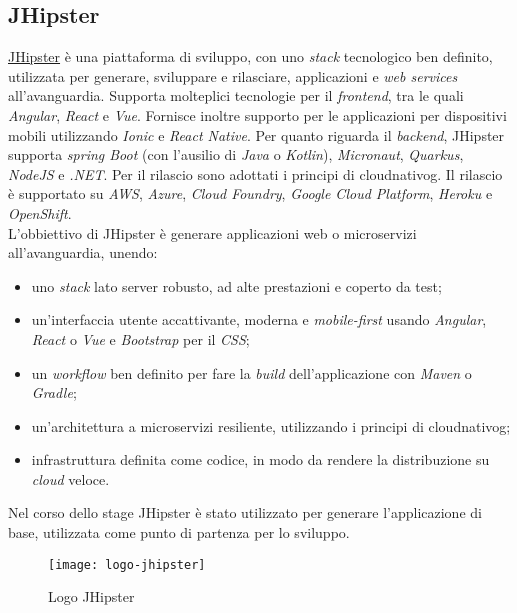 \subsection{JHipster}
\label{jhi}
\href{https://www.jhipster.tech/}{JHipster} è una piattaforma di sviluppo, con uno \textit{stack} tecnologico ben definito, utilizzata per generare, sviluppare e rilasciare, applicazioni e \textit{web services} all'avanguardia. Supporta molteplici tecnologie per il \textit{frontend}, tra le quali \textit{Angular}, \textit{React} e \textit{Vue}. Fornisce inoltre supporto per le applicazioni per dispositivi mobili utilizzando \textit{Ionic} e \textit{React Native}. Per quanto riguarda il \textit{backend}, JHipster supporta \textit{spring Boot} (con l'ausilio di \textit{Java} o \textit{Kotlin}), \textit{Micronaut}, \textit{Quarkus}, \textit{NodeJS} e \textit{.NET}. Per il rilascio sono adottati i principi di \gls{cloudnativog}\glsfirstoccur{}. Il rilascio è supportato su \textit{AWS}, \textit{Azure}, \textit{Cloud Foundry}, \textit{Google Cloud Platform}, \textit{Heroku} e \textit{OpenShift}.
\\L'obbiettivo di JHipster è generare applicazioni web o microservizi all'avanguardia, unendo:
\begin{itemize}
    \item uno \textit{stack} lato server robusto, ad alte prestazioni e coperto da test;
    \item un'interfaccia utente accattivante, moderna e \textit{mobile-first} usando \textit{Angular}, \textit{React} o \textit{Vue} e \textit{Bootstrap} per il \textit{CSS};
    \item un \textit{workflow} ben definito per fare la \textit{build} dell'applicazione con \textit{Maven} o \textit{Gradle};
    \item un'architettura a microservizi resiliente,  utilizzando i principi di \gls{cloudnativog};
    \item infrastruttura definita come codice, in modo da rendere la distribuzione su \textit{cloud} veloce.
\end{itemize}
\newpage
Nel corso dello stage JHipster è stato utilizzato per generare l'applicazione di base, utilizzata come punto di partenza per lo sviluppo.
\begin{figure}[h]
    \begin{center}
    \texttt{[image: logo-jhipster]}
    \caption{Logo JHipster}
    \label{fig:figure2}
    \end{center}
\end{figure}

